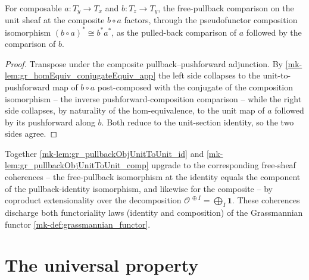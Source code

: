\begin{lemma}\label{mk-lem:gr_pullbackObjUnitToUnit_comp}
  \leanok

  For composable \(a : T_y \to T_x\) and \(b : T_z \to T_y\), the free-pullback comparison on
  the unit sheaf at the composite \(b \circ a\) factors, through the pseudofunctor composition
  isomorphism \((b\circ a)^{*}\cong b^{*}a^{*}\), as the pulled-back comparison of \(a\)
  followed by the comparison of \(b\).
\end{lemma}
\begin{proof}
  \leanok
  Transpose under the composite pullback--pushforward adjunction. By
  \ref{mk-lem:gr_homEquiv_conjugateEquiv_app} the left side collapses to the unit-to-pushforward
  map of \(b\circ a\) post-composed with the conjugate of the composition isomorphism -- the
  inverse pushforward-composition comparison -- while the right side collapses, by naturality
  of the hom-equivalence, to the unit map of \(a\) followed by its pushforward along \(b\).
  Both reduce to the unit-section identity, so the two sides agree.
\end{proof}


Together \ref{mk-lem:gr_pullbackObjUnitToUnit_id} and \ref{mk-lem:gr_pullbackObjUnitToUnit_comp}
upgrade to the corresponding free-sheaf coherences -- the free-pullback isomorphism at the
identity equals the component of the pullback-identity isomorphism, and likewise for the
composite -- by coproduct extensionality over the decomposition
\(\mathcal{O}^{\,\oplus I} = \bigoplus_I \mathbf 1\). These coherences discharge both
functoriality laws (identity and composition) of the Grassmannian
functor \ref{mk-def:grassmannian_functor}.


\section{The universal property}
\label{mk-sec:grquot_universal}

